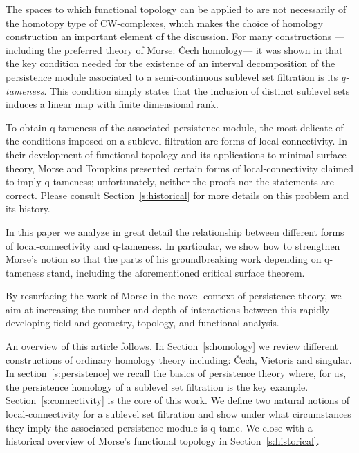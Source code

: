 The spaces to which functional topology can be applied to are not necessarily of the homotopy type of CW-complexes, which makes the choice of homology construction an important element of the discussion.
For many constructions ---including the preferred theory of Morse: \v{C}ech homology--- it was shown in \cite{schmahl2020structure} that the key condition needed for the existence of an interval decomposition of the persistence module associated to a semi-continuous sublevel set filtration is its \textit{q-tameness}.
This condition simply states that the inclusion of distinct sublevel sets induces a linear map with finite dimensional rank.

To obtain q-tameness of the associated persistence module, the most delicate of the conditions imposed on a sublevel filtration are forms of local-connectivity.
In their development of functional topology and its applications to minimal surface theory, Morse and Tompkins presented certain forms of local-connectivity claimed to imply q-tameness; unfortunately, neither the proofs nor the statements are correct.
Please consult Section~\ref{s:historical} for more details on this problem and its history.

In this paper we analyze in great detail the relationship between different forms of local-connectivity and q-tameness.
In particular, we show how to strengthen Morse's notion so that the parts of his groundbreaking work depending on q-tameness stand, including the aforementioned critical surface theorem.

By resurfacing the work of Morse in the novel context of persistence theory, we aim at increasing the number and depth of interactions between this rapidly developing field and geometry, topology, and functional analysis.

An overview of this article follows.
In Section~\ref{s:homology} we review different constructions of ordinary homology theory including: \v{C}ech, Vietoris and singular.
In section~\ref{s:persistence} we recall the basics of persistence theory where, for us, the persistence homology of a sublevel set filtration is the key example.
Section~\ref{s:connectivity} is the core of this work.
We define two natural notions of local-connectivity for a sublevel set filtration and show under what circumstances they imply the associated persistence module is q-tame.
We close with a historical overview of Morse's functional topology in Section~\ref{s:historical}.